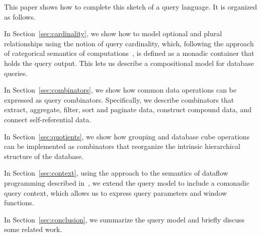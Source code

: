 This paper shows how to complete this sketch of a query language.  It is
organized as follows.

In Section~\ref{sec:cardinality}, we show how to model optional and plural
relationships using the notion of query cardinality, which, following the
approach of categorical semantics of computations~\cite{Moggi1991}, is defined
as a monadic container that holds the query output.  This lets us describe a
compositional model for database queries.

In Section~\ref{sec:combinators}, we show how common data operations can be
expressed as query combinators.  Specifically, we describe combinators that
extract, aggregate, filter, sort and paginate data, construct compound data, and
connect self-referential data.

In Section~\ref{sec:quotients}, we show how grouping and database cube
operations can be implemented as combinators that reorganize the intrinsic
hierarchical structure of the database.

In Section~\ref{sec:context}, using the approach to the semantics of dataflow
programming described in~\cite{Uustalu2005}, we extend the query model to
include a comonadic query context, which allows us to express query parameters
and window functions.

In Section~\ref{sec:conclusion}, we summarize the query model and briefly
discuss some related work.

